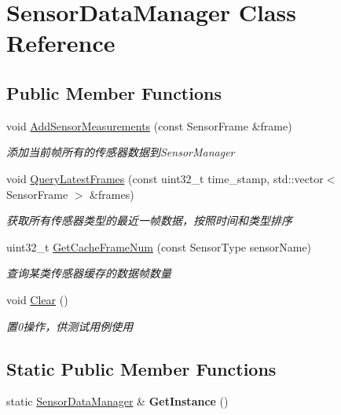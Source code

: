 \hypertarget{classSensorDataManager}{}\section{Sensor\+Data\+Manager Class Reference}
\label{classSensorDataManager}
\subsection*{Public Member Functions}
\begin{DoxyCompactItemize}
\item 
void \hyperlink{classSensorDataManager_aa77c1102b15426f743e63277af2731c2}{Add\+Sensor\+Measurements} (const Sensor\+Frame \&frame)
\begin{DoxyCompactList}\small\item\em 添加当前帧所有的传感器数据到\+Sensor\+Manager \end{DoxyCompactList}\item 
void \hyperlink{classSensorDataManager_ab08f7ee7b52dc79ae4ac201a7cb8ef74}{Query\+Latest\+Frames} (const uint32\+\_\+t time\+\_\+stamp, std\+::vector$<$ Sensor\+Frame $>$ \&frames)
\begin{DoxyCompactList}\small\item\em 获取所有传感器类型的最近一帧数据，按照时间和类型排序 \end{DoxyCompactList}\item 
uint32\+\_\+t \hyperlink{classSensorDataManager_a6775031f1005a7be711ecc75686ee092}{Get\+Cache\+Frame\+Num} (const Sensor\+Type sensor\+Name)
\begin{DoxyCompactList}\small\item\em 查询某类传感器缓存的数据帧数量 \end{DoxyCompactList}\item 
\mbox{\label{classSensorDataManager_a684637d9eeef7404a8ad31dc28724704}} 
void \hyperlink{classSensorDataManager_a684637d9eeef7404a8ad31dc28724704}{Clear} ()
\begin{DoxyCompactList}\small\item\em 置0操作，供测试用例使用 \end{DoxyCompactList}\end{DoxyCompactItemize}
\subsection*{Static Public Member Functions}
\begin{DoxyCompactItemize}
\item 
\mbox{\label{classSensorDataManager_ae170a745e8de5b9efa93234b98f159b3}} 
static \hyperlink{classSensorDataManager}{Sensor\+Data\+Manager} \& {\bfseries Get\+Instance} ()
\end{DoxyCompactItemize}

